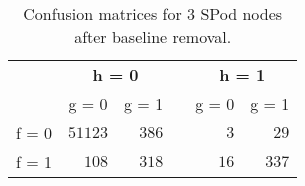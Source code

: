\begin{table}[!tbp]
\caption{Confusion matrices for 3 SPod nodes after baseline removal.\label{conf}} 
\begin{center}
\begin{tabular}{lrrcrr}
\hline\hline
\multicolumn{1}{l}{\bfseries }&\multicolumn{2}{c}{\bfseries h = 0}&\multicolumn{1}{c}{\bfseries }&\multicolumn{2}{c}{\bfseries h = 1}\tabularnewline
\cline{2-3} \cline{5-6}
\multicolumn{1}{l}{}&\multicolumn{1}{c}{g = 0}&\multicolumn{1}{c}{g = 1}&\multicolumn{1}{c}{}&\multicolumn{1}{c}{g = 0}&\multicolumn{1}{c}{g = 1}\tabularnewline
\hline
f = 0&$51123$&$386$&&$ 3$&$ 29$\tabularnewline
f = 1&$  108$&$318$&&$16$&$337$\tabularnewline
\hline
\end{tabular}\end{center}
\end{table}
